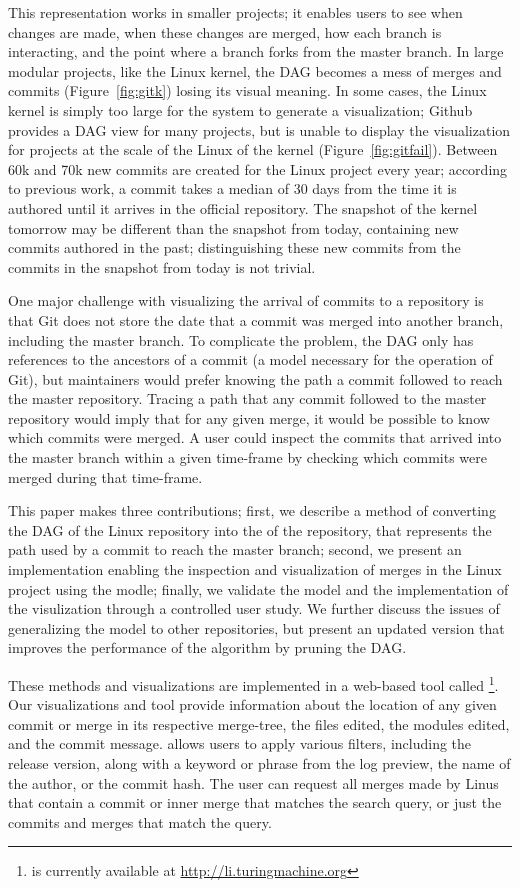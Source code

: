 This representation works in smaller projects; it enables users to see
when changes are made, when these changes are merged, how each branch is
interacting, and the point where a branch forks from the master branch.
In large modular projects, like the Linux kernel, the DAG becomes a mess
of merges and commits (Figure~\ref{fig:gitk}) losing its visual meaning.
In some cases, the Linux kernel is simply too large for the system to
generate a visualization; Github provides a DAG view for many projects,
but is unable to display the visualization for projects at the scale of
the Linux of the kernel (Figure~\ref{fig:gitfail}).  Between 60k and 70k
new commits are created for the Linux project every year; according to
previous work\cite{German2015}, a commit takes a median of 30 days from
the time it is authored until it arrives in the official repository. The
snapshot of the kernel tomorrow may be different than the snapshot from
today, containing new commits authored in the past; distinguishing these
new commits from the commits in the snapshot from today is not trivial.

One major challenge with visualizing the arrival of commits to a
repository is that Git does not store the date that a commit was merged
into another branch, including the master branch. To complicate the
problem, the DAG only has references to the ancestors of a commit (a
model necessary for the operation of Git), but maintainers would prefer
knowing the path a commit followed to reach the master repository.
Tracing a path that any commit followed to the master repository would
imply that for any given merge, it would be possible to know which
commits were merged. A user could inspect the commits that arrived into
the master branch within a given time-frame by checking which commits
were merged during that time-frame.

This paper makes three contributions; first, we describe a method of
converting the DAG of the Linux repository into the \mt of the
repository, that represents the path used by a commit to reach the
master branch; second, we present an implementation enabling the
inspection and visualization of merges in the Linux project using the
\mt modle; finally, we validate the \mt model and the implementation of
the visulization through a controlled user study. We further discuss the
issues of generalizing the model to other repositories, but present an
updated version that improves the performance of the algorithm by
pruning the DAG.\@

These methods and visualizations are implemented in a web-based tool
called \tool\footnote{\tool is currently available at
  \url{http://li.turingmachine.org}}.  Our visualizations and tool
provide information about the location of any given commit or merge in
its respective merge-tree, the files edited, the modules edited, and the
commit message. \tool allows users to apply various filters, including
the release version, along with a keyword or phrase from the log
preview, the name of the author, or the commit hash. The user can
request all merges made by Linus that contain a commit or inner merge
that matches the search query, or just the commits and merges that match
the query.

